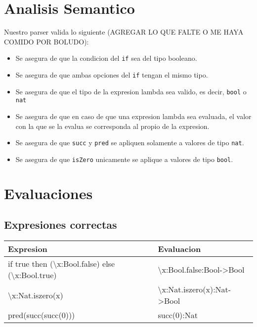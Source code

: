 \documentclass{article}
\theoremstyle{definition}
\theoremstyle{remark}
\begin{document}
\section{Analisis Semantico}

Nuestro parser valida lo siguiente (AGREGAR LO QUE FALTE O ME HAYA COMIDO POR BOLUDO):

\begin{itemize}
	\item Se asegura de que la condicion del \texttt{if} sea del tipo booleano.
	\item Se asegura de que ambas opciones del \texttt{if} tengan el mismo tipo.
	\item Se asegura de que el tipo de la expresion lambda sea valido, es decir, \texttt{bool} o \texttt{nat}
	\item Se asegura de que en caso de que una expresion lambda sea evaluada, el valor con la que se la evalua se corresponda al propio de la expresion.
	\item Se asegura de que \texttt{succ} y \texttt{pred} se apliquen solamente a valores de tipo \texttt{nat}.
	\item Se asegura de que \texttt{isZero} unicamente se aplique a valores de tipo \texttt{bool}.
\end{itemize}

\section{Evaluaciones}

\subsection{Expresiones correctas}

\begin{tabular}{|l|l|}
\hline
Expresion                                                                    & Evaluacion                                          \\ \hline
if true then (\textbackslash x:Bool.false) else (\textbackslash x:Bool.true) & \textbackslash x:Bool.false:Bool-\textgreater Bool   \\ \hline
\textbackslash x:Nat.iszero(x)                                               & \textbackslash x:Nat.iszero(x):Nat-\textgreater Bool \\ \hline
pred(succ(succ(0)))                                                          & succ(0):Nat                                         \\ \hline
\end{tabular}
\end{document}
